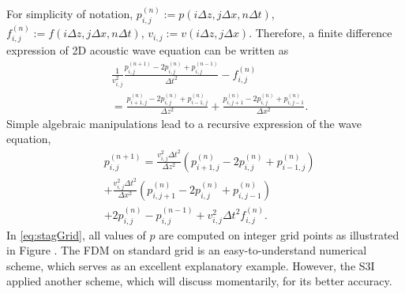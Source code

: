 \documentclass[11pt,titlepage]{article}
\theoremstyle{plain}
\theoremstyle{definition}
\theoremstyle{remark}
\numberwithin{equation}{section}
\begin{document}
For simplicity of notation, $p_{i,j}^{(n)}:=  p(i\Delta z, j\Delta x, n\Delta t)$, $f_{i,j}^{(n)} := f(i\Delta z, j\Delta x, n\Delta t)$, $v_{i,j} := v(i\Delta z, j\Delta x)$. Therefore, a finite difference expression of 2D acoustic wave equation can be written as 
  \begin{equation}
    \begin{aligned}
    &\frac{1}{v_{i,j}^2}\frac{p_{i,j}^{(n+1)} - 2p_{i,j}^{(n)} + p_{i,j}^{(n-1)}}{\Delta t^2} - f_{i,j}^{(n)}\\
    &= \frac{p_{i+1,j}^{(n)} - 2p_{i,j}^{(n)} + p_{i-1,j}^{(n)}}{\Delta z^2} + \frac{p_{i,j+1}^{(n)} - 2p_{i,j}^{(n)} + p_{i,j-1}^{(n)}}{\Delta x^2}.
    \end{aligned}
  \end{equation}
Simple algebraic manipulations lead to a recursive expression of the wave equation,
  \begin{equation}
  \label{eq:stagGrid}
    \begin{aligned}
    &p_{i,j}^{(n+1)} = \frac{v_{i,j}^2\Delta t^2}{\Delta z^2}\left(p_{i+1,j}^{(n)} - 2p_{i,j}^{(n)} + p_{i-1,j}^{(n)}\right)\\
    &+ \frac{v_{i,j}^2\Delta t^2}{\Delta x^2}\left(p_{i,j+1}^{(n)} - 2p_{i,j}^{(n)} + p_{i,j-1}^{(n)}\right)\\
    &+ 2p_{i,j}^{(n)}-p_{i,j}^{(n-1)} + v_{i,j}^2\Delta t^2 f_{i,j}^{(n)}.
    \end{aligned}
  \end{equation}
  In \eqref{eq:stagGrid}, all values of $p$ are computed on integer grid points as illustrated in Figure . The FDM on standard grid is an easy-to-understand numerical scheme, which serves as an excellent explanatory example. However, the S3I applied another scheme, which will discuss momentarily, for its better accuracy.  
  
\end{document}
